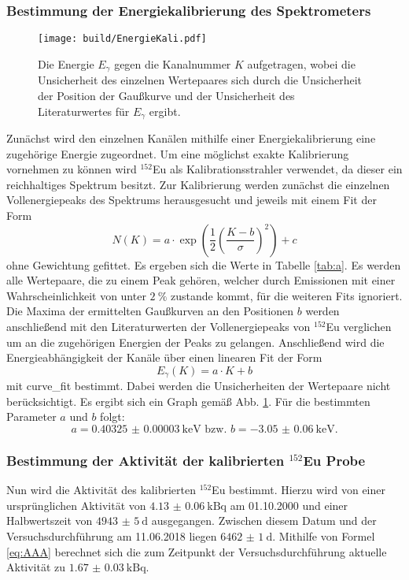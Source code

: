\subsubsection{Bestimmung der Energiekalibrierung des Spektrometers}
\label{subsec:EnergieKali}
\begin{figure}
	\centering
	\texttt{[image: build/EnergieKali.pdf]}
	\caption{Die Energie $E_\gamma$ gegen die Kanalnummer $K$ aufgetragen, wobei die Unsicherheit des einzelnen Wertepaares sich durch die Unsicherheit der Position der Gaußkurve und der Unsicherheit des Literaturwertes für $E_\gamma$ ergibt.}
	\label{fig:E}
\end{figure}
Zunächst wird den einzelnen Kanälen mithilfe einer Energiekalibrierung eine zugehörige Energie zugeordnet. Um eine möglichst exakte Kalibrierung vornehmen zu können wird $^{152}$Eu als Kalibrationsstrahler verwendet, da dieser ein reichhaltiges Spektrum besitzt. Zur Kalibrierung werden zunächst die einzelnen Vollenergiepeaks des Spektrums herausgesucht und jeweils mit einem Fit der Form
\begin{equation}
    N(K)=a \cdot \exp\left(\frac{1}{2}\left( \frac{K-b}{\sigma}\right)^2\right) +c \label{eq:gaußFit}
\end{equation}
ohne Gewichtung gefittet. Es ergeben sich die Werte in Tabelle \ref{tab:a}. Es werden alle Wertepaare, die zu einem Peak gehören, welcher durch Emissionen mit einer Wahrscheinlichkeit von unter $\SI{2}{\percent}$ zustande kommt, für die weiteren Fits ignoriert. Die Maxima der ermittelten Gaußkurven an den Positionen $b$ werden anschließend mit den Literaturwerten der Vollenergiepeaks von $^{152}$Eu \cite{MARTIN20131497} verglichen um an die zugehörigen Energien der Peaks zu gelangen. Anschließend wird die Energieabhängigkeit der Kanäle über einen linearen Fit der Form 
\begin{equation}
	E_\gamma(K)=a \cdot K+b \label{eq:eKali}
\end{equation}
mit curve\_fit \cite{scipy} bestimmt. Dabei werden die Unsicherheiten der Wertepaare nicht berücksichtigt. Es ergibt sich ein Graph gemäß Abb. \ref{fig:E}. Für die bestimmten Parameter $a$ und $b$ folgt:
\begin{equation}
a = \SI{0.40325(3)}{\kilo\electronvolt} \text{ bzw. } b = \SI{-3.05(6)}{\kilo\electronvolt}.
\end{equation}


\subsubsection{Bestimmung der Aktivität der kalibrierten $^{152}$Eu Probe}
Nun wird die Aktivität des kalibrierten $^{152}$Eu bestimmt. Hierzu wird von einer ursprünglichen Aktivität von $\SI{4.13(6)}{\kilo\becquerel}$ am 01.10.2000 und einer Halbwertszeit von $\SI{4943(5)}{\day}$ \cite{V18} ausgegangen. Zwischen diesem Datum und der Versuchsdurchführung am 11.06.2018 liegen $\SI{6462(1)}{\day}$. Mithilfe von Formel \eqref{eq:AAA} berechnet sich die zum Zeitpunkt der Versuchsdurchführung aktuelle Aktivität zu $\SI{1.67(3)}{\kilo\becquerel}$.

